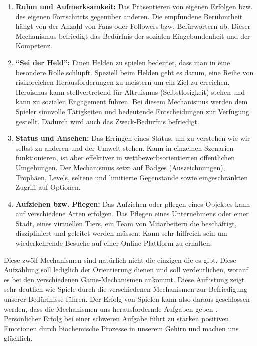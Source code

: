 \documentclass[a4paper,12pt,twoside]{scrartcl}
\begin{document}
\begin{description}
\begin{enumerate}
      \item \textbf{Ruhm und Aufmerksamkeit:} Das Präsentieren von eigenen Erfolgen bzw. des eigenen Fortschritts gegenüber anderen. Die empfundene Berühmtheit hängt von der Anzahl von Fans oder Followers bzw. Befürwortern ab. Dieser Mechanismus befriedigt das Bedürfnis der sozialen Eingebundenheit und der Kompetenz.
      \item \textbf{\enquote{Sei der Held}:} Einen Helden zu spielen bedeutet, dass man in eine besondere Rolle schlüpft. Speziell beim Helden geht es darum, eine Reihe von risikoreichen Herausforderungen zu meistern um ein Ziel zu erreichen. Heroismus kann stellvertretend für Altruismus (Selbstlosigkeit) stehen und kann zu sozialen Engagement führen. Bei diesem Mechanismus werden dem Spieler sinnvolle Tätigkeiten und bedeutende Entscheidungen zur Verfügung gestellt. Dadurch wird auch das Zweck-Bedürfnis befriedigt. 
      \item \textbf{Status und Ansehen:} Das Erringen eines Status, um zu verstehen wie wir selbst zu anderen und der Umwelt stehen. Kann in einzelnen Szenarien funktionieren, ist aber effektiver in wettbewerbsorientierten öffentlichen Umgebungen. Der Mechanismus setzt auf Badges (Auszeichnungen), Trophäen, Levels, seltene und limitierte Gegenstände sowie eingeschränkten Zugriff auf Optionen.
      \item \textbf{Aufziehen bzw. Pflegen:} Das Aufziehen oder pflegen eines Objektes kann auf verschiedene Arten erfolgen. Das Pflegen eines Unternehmens oder einer Stadt, eines virtuellen Tiers, ein Team von Mitarbeitern die beschäftigt, diszipliniert und geleitet werden müssen. Kann sehr hilfreich sein um wiederkehrende Besuche auf einer Online-Plattform zu erhalten.
   \end{enumerate}
\end{description}
Diese zwölf Mechanismen sind natürlich nicht die einzigen die es gibt. Diese Aufzählung soll lediglich der Orientierung dienen und soll verdeutlichen, worauf es bei den verschiedenen Game-Mechanismen ankommt. Diese Auflistung zeigt sehr deutlich wie Spiele durch die verschiedenen Mechanismen zur Befriedigung unserer Bedürfnisse führen. Der Erfolg von Spielen kann also daraus geschlossen werden, dass die Mechanismen uns herausfordernde Aufgaben geben \cite{Mcgonigal2011}. Persönlicher Erfolg bei einer schweren Aufgabe führt zu starken positiven Emotionen durch biochemische Prozesse in unserem Gehirn und machen uns glücklich.
\\\\
\end{document}
